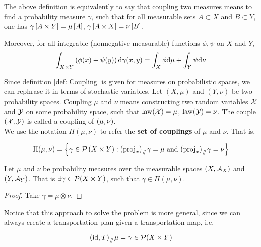 The above definition is equivalently to say that coupling two measures means to find a probability measure $\gamma$, such that for all measurable sets $A\subset X$ and $B\subset Y$, one has $\gamma\left[ A\times Y \right]=\mu\left[ A \right]$, $\gamma\left[ A\times X \right]=\nu\left[ B \right]$.

Moreover, for all integrable (nonnegative measurable) functions $\phi, \psi$ on $X$ and $Y$,
\begin{equation*}
	\int_{X\times Y}\left( \phi(x)+\psi(y) \right)\mathrm{d}\gamma(x,y)=\int_{X}\phi\mathrm{d}\mu+\int_{Y}\psi\mathrm{d}\nu
\end{equation*}

Since definition \ref{def: Coupling} is given for measures on probabilistic spaces, we can rephrase it in terms of stochastic variables. Let $(X, \mu)$ and $(Y, \nu)$ be two probability spaces. Coupling $\mu$ and $\nu$ means constructing two random variables $\mathcal{X}$ and $\mathcal{Y}$ on some probability space, such that $\mathrm{law}(\mathcal{X})=\mu$, $\mathrm{law}(\mathcal{Y})=\nu$. The couple $\left( \mathcal{X},\mathcal{Y} \right)$ is called a coupling of $\left( \mu, \nu \right)$. \\


We use the notation $\Pi(\mu, \nu)$ to refer the \textbf{set of couplings} of $\mu$ and $\nu$. That is,

\begin{equation}
\Pi(\mu, \nu)=\braces{\gamma \in \PlanSp\parentheses{X\times Y}: \Tmeasure{\gamma}{\parentheses{\proj_x}}=\mu \ \mand \ \Tmeasure{\gamma}{\parentheses{\proj_x}}=\nu}
\end{equation}

\begin{lemma}
	\label{lm: Existence of a coupling}
Let $\mu$ and $\nu$ be probability measures over the measurable spaces $\left( X, \mathcal{A}_X \right)$ and $\left( Y, \mathcal{A}_Y \right)$. That is $\exists \gamma \in \mathcal{P}(X\times Y)$, such that $\gamma\in\Pi(\mu, \nu)$.
\end{lemma}
\begin{proof}
	Take $\gamma=\mu\otimes\nu$.
\end{proof}


Notice that this approach to solve the problem is more general, since we can always create a transportation plan given a transportation map, i.e.

\begin{equation*}
{(\mathrm{id}, T)}_{\#} \mu=\gamma \in \mathcal{P}(X\times Y)
\end{equation*}

